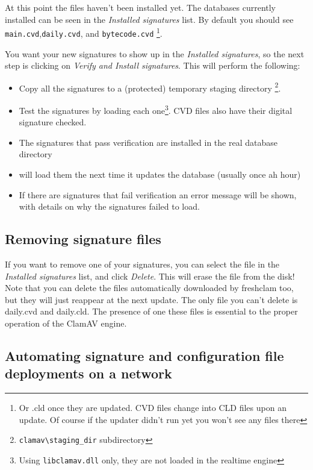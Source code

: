 At this point the files haven't been installed yet.
The databases currently installed can be seen in the \emph{Installed signatures} list.
By default you should see \verb+main.cvd+,\verb+daily.cvd+, and \verb+bytecode.cvd+
\footnote{Or .cld once they are updated. CVD files change into CLD files upon an update.
Of course if the updater didn't run yet you won't see any files there}.

You want your new signatures to show up in the \emph{Installed signatures}, so the next step is clicking on \emph{Verify and Install signatures}.
This will perform the following:
\begin{itemize}
\item Copy all the signatures to a (protected) temporary staging directory \footnote{\texttt{clamav\textbackslash staging\_dir} subdirectory}.
\item Test the signatures by loading each one\footnote{Using \texttt{libclamav.dll} only, they are not loaded in the realtime engine}. CVD files also have their digital signature checked.
\item The signatures that pass verification are installed in the real database directory
\item \CW will load them the next time it updates the database (usually once ah hour)
\item If there are signatures that fail verification an error message will be shown, with details on why the signatures failed to load.
\end{itemize}

\subsection{Removing signature files}
\label{sec:localremove}
If you want to remove one of your signatures, you can select the file in the \emph{Installed signatures} list, and click \emph{Delete}. This will erase the file from the disk!
Note that you can delete the files automatically downloaded by \gls{freshclam} too, but they will just reappear at the next update.  The only file you can't delete is \gls{daily.cvd} and \gls{daily.cld}.
The presence of one these files is essential to the proper operation of the \gls{ClamAV} engine.

\subsection{Automating signature and configuration file deployments on a network}
\label{sec:customautomatedcopy}
\label{sec:deploy_conf}

